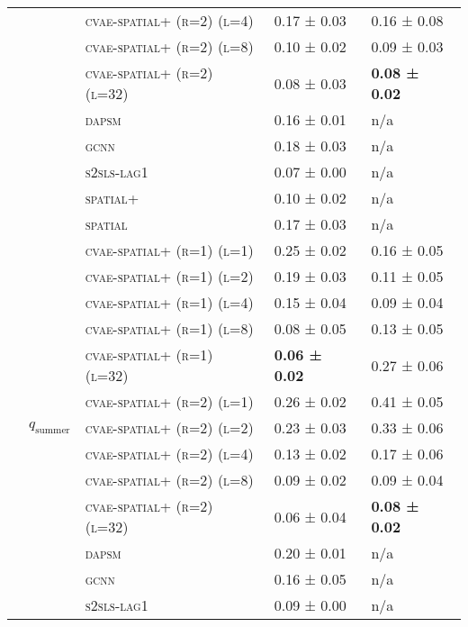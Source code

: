 \documentclass{article}
\begin{document}
\begin{table}[!tbp]
\begin{tabular}{lllll}
 &  & \textsc{cvae-\textsc{spatial+} (r=2) (l=4)} & 0.17 ± {\small 0.03} & 0.16 ± {\small 0.08} \\
 &  & \textsc{cvae-\textsc{spatial+} (r=2) (l=8)} & 0.10 ± {\small 0.02} & 0.09 ± {\small 0.03} \\
 &  & \textsc{cvae-\textsc{spatial+} (r=2) (l=32)} & 0.08 ± {\small 0.03} & \bf 0.08 ± {\small 0.02} \\
 &  & \textsc{dapsm} & 0.16 ± {\small 0.01} & n/a \\
 &  & \textsc{gcnn} & 0.18 ± {\small 0.03} & n/a \\
 &  & \textsc{s2sls-lag1} & 0.07 ± {\small 0.00} & n/a \\
 &  & \textsc{spatial+} & 0.10 ± {\small 0.02} & n/a \\
 &  & \textsc{spatial} & 0.17 ± {\small 0.03} & n/a \\
\cline{2-5}
 & \multirow[t]{15}{*}{$q_{\text{summer}}$} & \textsc{cvae-\textsc{spatial+} (r=1) (l=1)} & 0.25 ± {\small 0.02} & 0.16 ± {\small 0.05} \\
 &  & \textsc{cvae-\textsc{spatial+} (r=1) (l=2)} & 0.19 ± {\small 0.03} & 0.11 ± {\small 0.05} \\
 &  & \textsc{cvae-\textsc{spatial+} (r=1) (l=4)} & 0.15 ± {\small 0.04} & 0.09 ± {\small 0.04} \\
 &  & \textsc{cvae-\textsc{spatial+} (r=1) (l=8)} & 0.08 ± {\small 0.05} & 0.13 ± {\small 0.05} \\
 &  & \textsc{cvae-\textsc{spatial+} (r=1) (l=32)} & \bf 0.06 ± {\small 0.02} & 0.27 ± {\small 0.06} \\
 &  & \textsc{cvae-\textsc{spatial+} (r=2) (l=1)} & 0.26 ± {\small 0.02} & 0.41 ± {\small 0.05} \\
 &  & \textsc{cvae-\textsc{spatial+} (r=2) (l=2)} & 0.23 ± {\small 0.03} & 0.33 ± {\small 0.06} \\
 &  & \textsc{cvae-\textsc{spatial+} (r=2) (l=4)} & 0.13 ± {\small 0.02} & 0.17 ± {\small 0.06} \\
 &  & \textsc{cvae-\textsc{spatial+} (r=2) (l=8)} & 0.09 ± {\small 0.02} & 0.09 ± {\small 0.04} \\
 &  & \textsc{cvae-\textsc{spatial+} (r=2) (l=32)} & 0.06 ± {\small 0.04} & \bf 0.08 ± {\small 0.02} \\
 &  & \textsc{dapsm} & 0.20 ± {\small 0.01} & n/a \\
 &  & \textsc{gcnn} & 0.16 ± {\small 0.05} & n/a \\
 &  & \textsc{s2sls-lag1} & 0.09 ± {\small 0.00} & n/a \\

\end{tabular}
\end{table}
\end{document}
